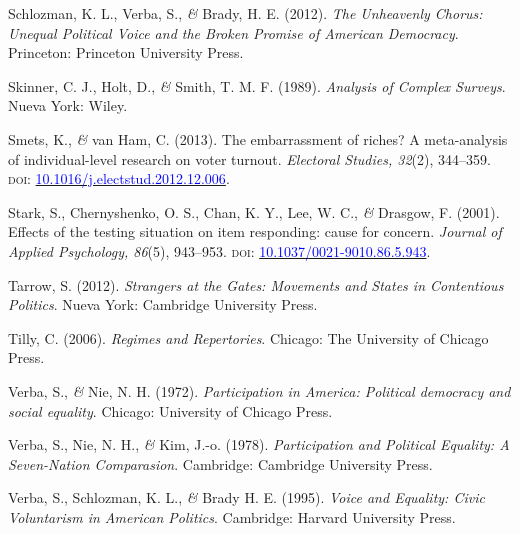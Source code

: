 \documentclass[a4paper]{tufte-handout}
\begin{document}
\begin{list}{}
\item{\small Schlozman, K. L., Verba, S., {\itshape \&} Brady, H. E. (2012). {\itshape The Unheavenly Chorus: Unequal Political Voice and the Broken Promise of American Democracy}. Princeton: Princeton University Press.}

\item{\small Skinner, C. J., Holt, D., {\itshape \&} Smith, T. M. F. (1989). {\itshape Analysis of Complex Surveys}. Nueva York: Wiley.}

\item{\small Smets, K., {\itshape \&} van Ham, C. (2013). The embarrassment of riches? A meta-analysis of individual-level research on voter turnout. {\itshape Electoral Studies, 32}(2), 344--359. {\scshape doi:} \href{https://doi.org/10.1016/j.electstud.2012.12.006}{\textcolor{blue}{10.1016/j.electstud.2012.12.006}}.}

\item{\small Stark, S., Chernyshenko, O. S., Chan, K. Y., Lee, W. C., {\itshape \&} Drasgow, F. (2001). Effects of the testing situation on item responding: cause for concern. {\itshape Journal of Applied Psychology, 86}(5), 943--953. {\scshape doi:} \href{https://doi.org/10.1037/0021-9010.86.5.943}{\textcolor{blue}{10.1037/0021-9010.86.5.943}}.}

\item{\small Tarrow, S. (2012). {\itshape Strangers at the Gates: Movements and States in Contentious Politics}. Nueva York: Cambridge University Press.}

\item{\small Tilly, C. (2006). {\itshape Regimes and Repertories}. Chicago: The University of Chicago Press.}

\item{\small Verba, S., {\itshape \&} Nie, N. H. (1972). {\itshape Participation in America: Political democracy and social equality}. Chicago: University of Chicago Press.}

\item{\small Verba, S., Nie, N. H., {\itshape \&} Kim, J.-o. (1978). {\itshape Participation and Political Equality: A Seven-Nation Comparasion}. Cambridge: Cambridge University Press.}

\item{\small Verba, S., Schlozman, K. L., {\itshape \&} Brady H. E. (1995). {\itshape Voice and Equality: Civic Voluntarism in American Politics}. Cambridge: Harvard University Press.}

\end{list}
\end{document}
